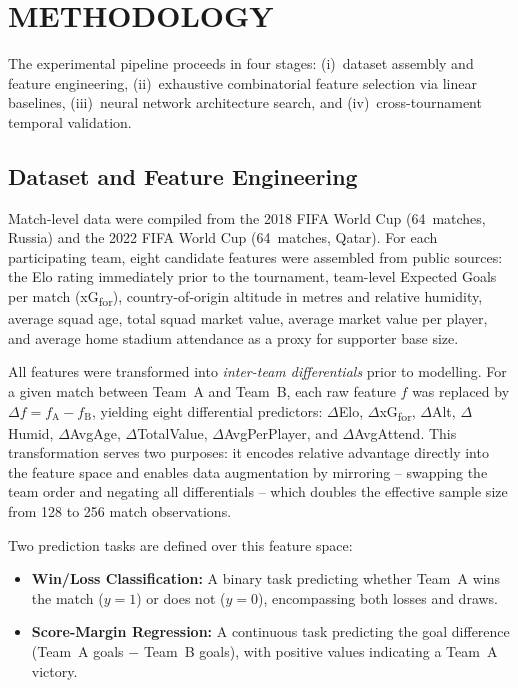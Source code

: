 \documentclass[a4paper,twoside]{article}
\begin{document}
\section{\uppercase{Methodology}}
\label{sec:methodology}

\noindent
The experimental pipeline proceeds in four stages: (i)~dataset assembly and feature engineering, (ii)~exhaustive combinatorial feature selection via linear baselines, (iii)~neural network architecture search, and (iv)~cross-tournament temporal validation.

\subsection{Dataset and Feature Engineering}

Match-level data were compiled from the 2018 FIFA World Cup (64~matches, Russia) and the 2022 FIFA World Cup (64~matches, Qatar).
For each participating team, eight candidate features were assembled from public sources: the Elo rating immediately prior to the tournament, team-level Expected Goals per match (xG\textsubscript{for}), country-of-origin altitude in metres and relative humidity, average squad age, total squad market value, average market value per player, and average home stadium attendance as a proxy for supporter base size.

All features were transformed into \textit{inter-team differentials} prior to modelling.
For a given match between Team~A and Team~B, each raw feature $f$ was replaced by $\Delta f = f_{\text{A}} - f_{\text{B}}$, yielding eight differential predictors: $\Delta$Elo, $\Delta$xG\textsubscript{for}, $\Delta$Alt, $\Delta$Humid, $\Delta$AvgAge, $\Delta$TotalValue, $\Delta$AvgPerPlayer, and $\Delta$AvgAttend.
This transformation serves two purposes: it encodes relative advantage directly into the feature space and enables data augmentation by mirroring -- swapping the team order and negating all differentials -- which doubles the effective sample size from 128 to 256 match observations.

Two prediction tasks are defined over this feature space:
\begin{itemize}
  \item \textbf{Win/Loss Classification:} A binary task predicting whether Team~A wins the match ($y = 1$) or does not ($y = 0$), encompassing both losses and draws.
  \item \textbf{Score-Margin Regression:} A continuous task predicting the goal difference (Team~A goals $-$ Team~B goals), with positive values indicating a Team~A victory.
\end{itemize}
\end{document}
